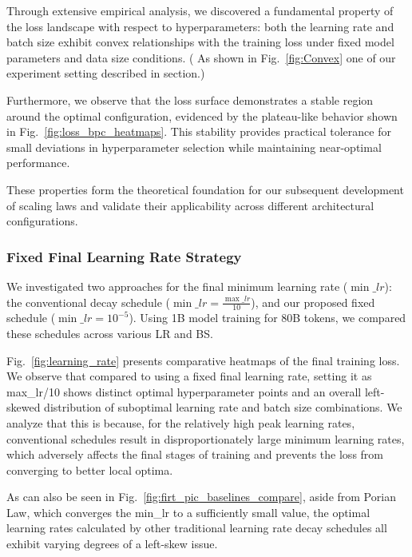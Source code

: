 \documentclass[11pt]{article}
\begin{document}
    Through extensive empirical analysis, we discovered a fundamental property
    of the loss landscape with respect to hyperparameters: both the learning rate and
    batch size exhibit convex relationships with the training loss under fixed model
    parameters and data size conditions. ( As shown in Fig.~\ref{fig:Convex} one
    of our experiment setting described in section.)

    Furthermore, we observe that the loss surface demonstrates a stable region around
    the optimal configuration, evidenced by the plateau-like behavior shown in
    Fig.~\ref{fig:loss_bpc_heatmaps}. This stability provides practical
    tolerance for small deviations in hyperparameter selection while maintaining
    near-optimal performance.

    These properties form the theoretical foundation for our subsequent
    development of scaling laws and validate their applicability across
    different architectural configurations.
    \subsubsection{Fixed Final Learning Rate Strategy}
    \label{fixed_final_lr}

    We investigated two approaches for the final minimum learning rate ($\min\_lr$):
    the conventional decay schedule ($\min\_lr = \frac{\max\_lr}{10}$)\cite{Brown2020,Jin2023,Touvron2023a,Touvron2023b,biderman2023pythiasuiteanalyzinglarge,workshop2023bloom176bparameteropenaccessmultilingual,Shen2024}, and our proposed
    fixed schedule ($\min\_lr = 10^{-5}$). Using 1B model training for 80B
    tokens, we compared these schedules across various LR and BS.

    Fig.~\ref{fig:learning_rate} presents comparative heatmaps of the final training
    loss. We observe that compared to using a fixed final learning rate, setting it as max\_lr/10 shows distinct optimal hyperparameter points and an overall left-skewed distribution of suboptimal learning rate and batch size combinations. We analyze that this is because, for the relatively high peak learning rates, conventional schedules result in disproportionately large minimum learning rates, which adversely affects the final stages of training and prevents the loss from converging to better local optima.

    As can also be seen in Fig.~\ref{fig:firt_pic_baselines_compare}, aside from Porian Law, which converges the min\_lr to a sufficiently small value, the optimal learning rates calculated by other traditional learning rate decay schedules all exhibit varying degrees of a left-skew issue.
    
\end{document}
